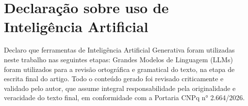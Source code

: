 \documentclass[12pt,a4paper]{article}
\begin{document}
\section*{Declaração sobre uso de Inteligência Artificial}
Declaro que ferramentas de Inteligência Artificial Generativa foram utilizadas neste trabalho nas seguintes etapas: Grandes Modelos de Linguagem (LLMs) foram utilizados para a revisão ortográfica e gramatical do texto, na etapa de escrita final do artigo. Todo o conteúdo gerado foi revisado criticamente e validado pelo autor, que assume integral responsabilidade pela originalidade e veracidade do texto final, em conformidade com a Portaria CNPq n° 2.664/2026.




\end{document}
